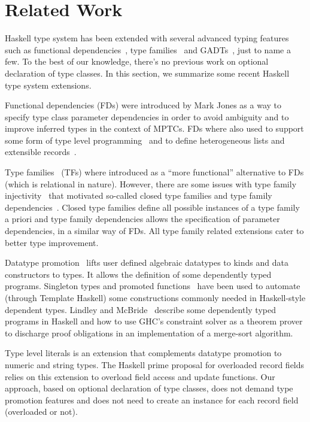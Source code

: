 \section{Related Work}
\label{sec:related-work}

Haskell type system has been extended with several advanced typing
features such as functional dependencies~\cite{Jones2008}, type
families~\cite{Chakravarty2005} and GADTs~\cite{Chen2016}, just to
name a few. To the best of our knowledge, there's no previous work on
optional declaration of type classes. In this section, we summarize
some recent Haskell type system extensions.

Functional dependencies (FDs) were introduced by Mark Jones as a way
to specify type class parameter dependencies in order to avoid
ambiguity and to improve inferred types in the context of MPTCs. FDs
where also used to support some form of type level
programming~\cite{Hallgren2000} and to define heterogeneous lists and
extensible records~\cite{KiselyovLS04}.

Type families~\cite{Chakravarty2005} (TFs) where introduced as a
``more functional'' alternative to FDs (which is relational in
nature). However, there are some issues with type family
injectivity~\cite{Eisenberg2014} that motivated so-called closed type
families and type family dependencies~\cite{Eisenberg2014a}. Closed
type families define all possible instances of a type family a priori
and type family dependencies allows the specification of parameter
dependencies, in a similar way of FDs.  All type family related
extensions cater to better type improvement.

Datatype promotion~\cite{Yorgey2012,Eisenberg2014} lifts user defined
algebraic datatypes to kinds and data constructors to types. It allows
the definition of some dependently typed programs.  Singleton types
and promoted functions~\cite{Eisenberg2012} have been used to automate
(through Template Haskell) some constructions commonly needed in
Haskell-style dependent types. Lindley and McBride~\cite{Lindley2013}
describe some dependently typed programs in Haskell and how to use
GHC's constraint solver as a theorem prover to discharge proof
obligations in an implementation of a merge-sort algorithm.

Type level literals is an extension that complements datatype
promotion to numeric and string types. The Haskell prime proposal for
overloaded record fields relies on this extension to overload field
access and update functions. Our approach, based on optional
declaration of type classes, does not demand type promotion features
and does not need to create an instance for each record field
(overloaded or not).
